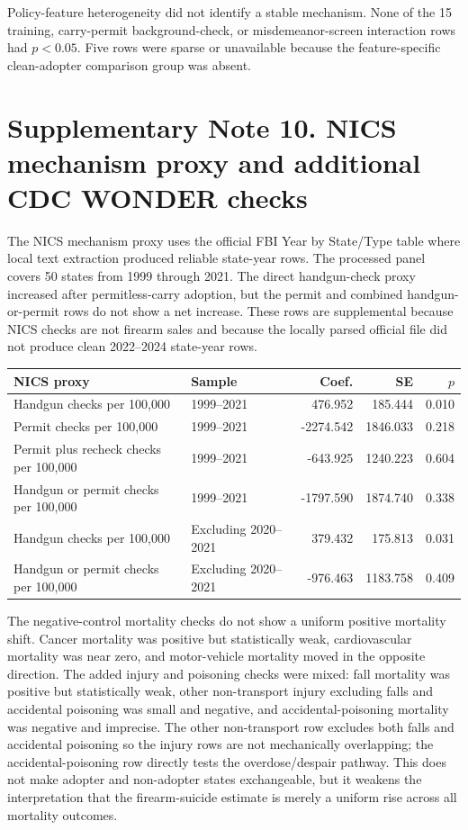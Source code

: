 \documentclass[10pt]{article}
\begin{document}
Policy-feature heterogeneity did not identify a stable mechanism. None of the 15 training, carry-permit background-check, or misdemeanor-screen interaction rows had $p<0.05$. Five rows were sparse or unavailable because the feature-specific clean-adopter comparison group was absent.

\section*{Supplementary Note 10. NICS mechanism proxy and additional CDC WONDER checks}

The NICS mechanism proxy uses the official FBI Year by State/Type table where local text extraction produced reliable state-year rows. The processed panel covers 50 states from 1999 through 2021. The direct handgun-check proxy increased after permitless-carry adoption, but the permit and combined handgun-or-permit rows do not show a net increase. These rows are supplemental because NICS checks are not firearm sales and because the locally parsed official file did not produce clean 2022--2024 state-year rows.

\begin{center}
\begin{tabular}{llrrr}
\toprule
NICS proxy & Sample & Coef. & SE & $p$ \\
\midrule
Handgun checks per 100,000 & 1999--2021 & 476.952 & 185.444 & 0.010 \\
Permit checks per 100,000 & 1999--2021 & -2274.542 & 1846.033 & 0.218 \\
Permit plus recheck checks per 100,000 & 1999--2021 & -643.925 & 1240.223 & 0.604 \\
Handgun or permit checks per 100,000 & 1999--2021 & -1797.590 & 1874.740 & 0.338 \\
Handgun checks per 100,000 & Excluding 2020--2021 & 379.432 & 175.813 & 0.031 \\
Handgun or permit checks per 100,000 & Excluding 2020--2021 & -976.463 & 1183.758 & 0.409 \\
\bottomrule
\end{tabular}
\end{center}

The negative-control mortality checks do not show a uniform positive mortality shift. Cancer mortality was positive but statistically weak, cardiovascular mortality was near zero, and motor-vehicle mortality moved in the opposite direction. The added injury and poisoning checks were mixed: fall mortality was positive but statistically weak, other non-transport injury excluding falls and accidental poisoning was small and negative, and accidental-poisoning mortality was negative and imprecise. The other non-transport row excludes both falls and accidental poisoning so the injury rows are not mechanically overlapping; the accidental-poisoning row directly tests the overdose/despair pathway. This does not make adopter and non-adopter states exchangeable, but it weakens the interpretation that the firearm-suicide estimate is merely a uniform rise across all mortality outcomes.
\end{document}
